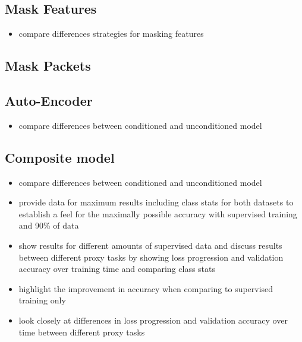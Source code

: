 \subsection{Mask Features} \label{sec:results:lstm:mask_feature}

\begin{itemize}
	\item compare differences strategies for masking features
\end{itemize} 

\subsection{Mask Packets} \label{sec:results:lstm:mask_packet}

\subsection{Auto-Encoder} \label{sec:results:lstm:auto_encoder}

\begin{itemize}
	\item compare differences between conditioned and unconditioned model
\end{itemize} 

\subsection{Composite model} \label{sec:results:lstm:composite}

\begin{itemize}
	\item compare differences between conditioned and unconditioned model
\end{itemize} 

\begin{itemize}
	\item provide data for maximum results including class stats for both datasets to establish a feel for the maximally possible accuracy with supervised training and 90\% of data
	\item show results for different amounts of supervised data and discuss results between different proxy tasks by showing loss progression and validation accuracy over training time and comparing class stats
	\item highlight the improvement in accuracy when comparing to supervised training only
	\item look closely at differences in loss progression and validation accuracy over time between different proxy tasks
\end{itemize}


